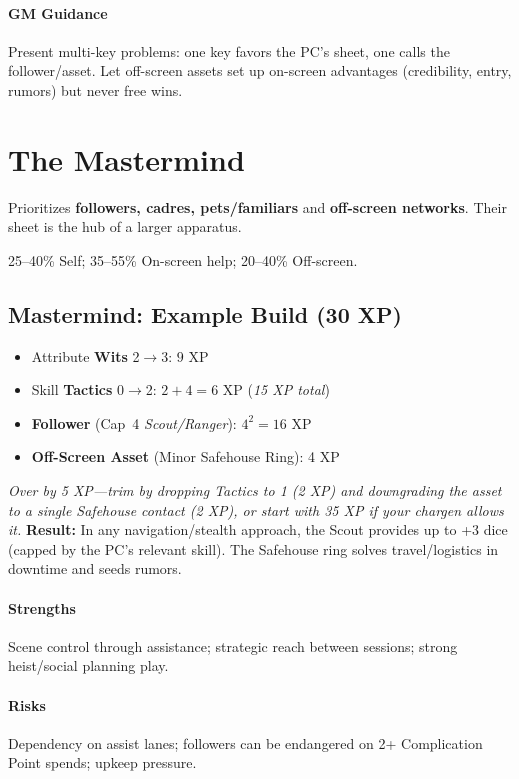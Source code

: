 \documentclass[12pt]{book}
\begin{document}
\paragraph{GM Guidance} Present multi-key problems: one key favors the PC's sheet, one calls the follower/asset. Let off-screen assets set up on-screen advantages (credibility, entry, rumors) but never free wins.

\section{The Mastermind}
\begin{description}[leftmargin=2cm]
  \item[Definition:] Prioritizes \textbf{followers, cadres, pets/familiars} and \textbf{off-screen networks}. Their sheet is the hub of a larger apparatus.
  \item[Typical XP Spread:] 25--40\% Self; 35--55\% On-screen help; 20--40\% Off-screen.
\end{description}

\subsection*{Mastermind: Example Build (30 XP)}
\begin{itemize}
  \item Attribute \textbf{Wits} 2$\rightarrow$3: $9$ XP
  \item Skill \textbf{Tactics} 0$\rightarrow$2: $2+4=6$ XP \hfill (\emph{15 XP total})
  \item \textbf{Follower} (Cap~4 \emph{Scout/Ranger}): $4^2=16$ XP
  \item \textbf{Off-Screen Asset} (Minor Safehouse Ring): 4 XP
\end{itemize}
\emph{Over by 5 XP—trim by dropping Tactics to 1 (2 XP) and downgrading the asset to a single Safehouse contact (2 XP), or start with 35 XP if your chargen allows it.}
\textbf{Result:} In any navigation/stealth approach, the Scout provides up to +3 dice (capped by the PC’s relevant skill). The Safehouse ring solves travel/logistics in downtime and seeds rumors.

\paragraph{Strengths} Scene control through assistance; strategic reach between sessions; strong heist/social planning play.  
\paragraph{Risks} Dependency on assist lanes; followers can be endangered on 2+ Complication Point spends; upkeep pressure.  
\end{document}
